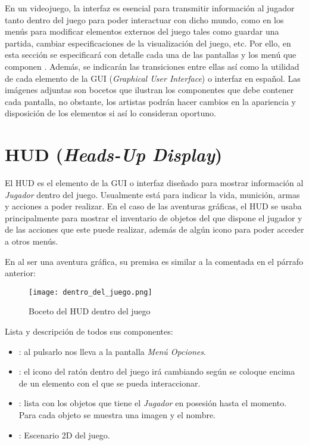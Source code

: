 En un videojuego, la interfaz es esencial para transmitir información al jugador tanto dentro del juego para poder interactuar con dicho mundo, como en los menús para modificar elementos externos del juego tales como guardar una partida, cambiar especificaciones de la visualización del juego, etc. Por ello, en esta sección se especificará con detalle cada una de las pantallas y los menú que componen \nombrejuego. Además, se indicarán las transiciones entre ellas así como la utilidad de cada elemento de la GUI (\emph{Graphical User Interface}) o interfaz en español. Las imágenes adjuntas son bocetos que ilustran los componentes que debe contener cada pantalla, no obstante, los artistas podrán hacer cambios en la apariencia y disposición de los elementos si así lo consideran oportuno.
    
    \newpage
    \section{HUD (\emph{Heads-Up Display})}
    El HUD es el elemento de la GUI o interfaz diseñado para mostrar información al \emph{Jugador} dentro del juego. Usualmente está para indicar la vida, munición, armas y acciones a poder realizar. En el caso de las aventuras gráficas, el HUD se usaba principalmente para mostrar el inventario de objetos del que dispone el jugador y de las acciones que este puede realizar, además de algún icono para poder acceder a otros menús.
    
    En \nombrejuego al ser una aventura gráfica, su premisa es similar a la comentada en el párrafo anterior:
    
    \begin{figure}[H] 
	     \begin{center}
	         \texttt{[image: dentro\_del\_juego.png]}
	     \end{center}
	     \caption{Boceto del HUD dentro del juego}
	     \label{fig:hud-dentro-juego}
	\end{figure}
	
	Lista y descripción de todos sus componentes:
	\begin{itemize}
	\item {}: al pulsarlo nos lleva a la pantalla \emph{Menú Opciones}.
	\item {}: el icono del ratón dentro del juego irá cambiando según se coloque encima de un elemento con el que se pueda interaccionar.
	\item {}: lista con los objetos que tiene el \emph{Jugador} en posesión hasta el momento. Para cada objeto se muestra una imagen y el nombre.
	\item {}: Escenario 2D del juego. 
	\end{itemize}
    
